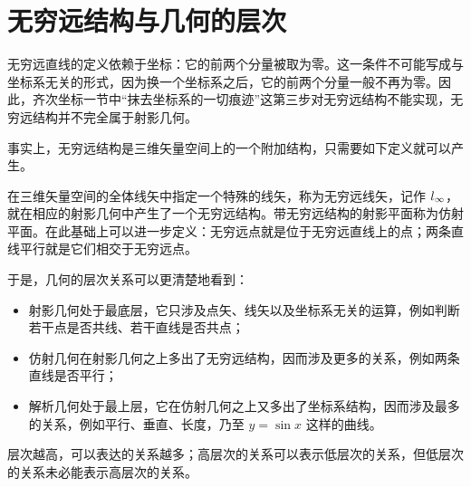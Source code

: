\section{无穷远结构与几何的层次}

无穷远直线的定义依赖于坐标：它的前两个分量被取为零。这一条件不可能写成与坐标系无关的形式，因为换一个坐标系之后，它的前两个分量一般不再为零。因此，齐次坐标一节中“抹去坐标系的一切痕迹”这第三步对无穷远结构不能实现，无穷远结构并不完全属于射影几何。

事实上，无穷远结构是三维矢量空间上的一个附加结构，只需要如下定义就可以产生。

\begin{definition}[仿射平面]
在三维矢量空间的全体线矢中指定一个特殊的线矢，称为无穷远线矢，记作 $l_{\infty}$，就在相应的射影几何中产生了一个无穷远结构。带无穷远结构的射影平面称为仿射平面。在此基础上可以进一步定义：无穷远点就是位于无穷远直线上的点；两条直线平行就是它们相交于无穷远点。
\end{definition}

于是，几何的层次关系可以更清楚地看到：

\begin{itemize}
\item 射影几何处于最底层，它只涉及点矢、线矢以及坐标系无关的运算，例如判断若干点是否共线、若干直线是否共点；
\item 仿射几何在射影几何之上多出了无穷远结构，因而涉及更多的关系，例如两条直线是否平行；
\item 解析几何处于最上层，它在仿射几何之上又多出了坐标系结构，因而涉及最多的关系，例如平行、垂直、长度，乃至 $y=\sin x$ 这样的曲线。
\end{itemize}

层次越高，可以表达的关系越多；高层次的关系可以表示低层次的关系，但低层次的关系未必能表示高层次的关系。

